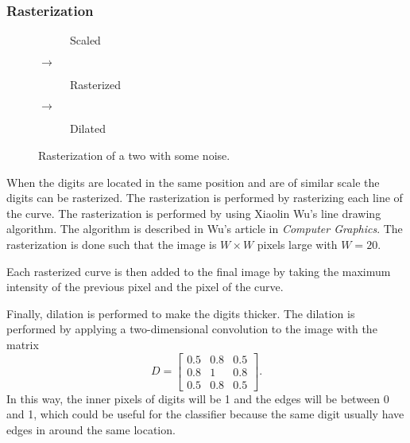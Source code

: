 \documentclass[report.tex]{subfile}
\begin{document}
\subsubsection{Rasterization}
\begin{figure}
    \centering
    \begin{subfigure}[c]{0.3\textwidth}
        \vspace*{-3.5mm}
        \resizebox{\textwidth}{!}{}
        \vspace*{-10mm}
        \caption{Scaled}
    \end{subfigure}%
    {\large $\rightarrow$}
    \begin{subfigure}[c]{0.3\textwidth}
        \centering
        \vfill
        \caption{Rasterized}
    \end{subfigure}%
    {\large $\rightarrow$}
    \begin{subfigure}[c]{0.3\textwidth}
        \centering
        \vfill
        \caption{Dilated}
    \end{subfigure}%
    \caption{Rasterization of a two with some noise.}
    \label{fig:raster_noise}
\end{figure}
When the digits are located in the same position and are of similar scale the
digits can be rasterized. The rasterization is performed by rasterizing each
line of the curve. The rasterization is performed by using Xiaolin Wu's line
drawing algorithm. The algorithm is described in Wu's article in \emph{Computer
Graphics}\cite{wu-line}. The rasterization is done such that the image is $W
\times W$ pixels large with $W = 20$.

Each rasterized curve is then added to the final image by taking the maximum
intensity of the previous pixel and the pixel of the curve.

Finally, dilation is performed to make the digits thicker. The dilation is
performed by applying a two-dimensional convolution to the image with the
matrix
\begin{equation*}
    D =
    \begin{bmatrix}
        0.5 & 0.8 & 0.5 \\
        0.8 &   1 & 0.8 \\
        0.5 & 0.8 & 0.5
    \end{bmatrix}.
\end{equation*}
In this way, the inner pixels of digits will be 1 and the edges will be between
0 and 1, which could be useful for the classifier because the same digit
usually have edges in around the same location.
\end{document}
